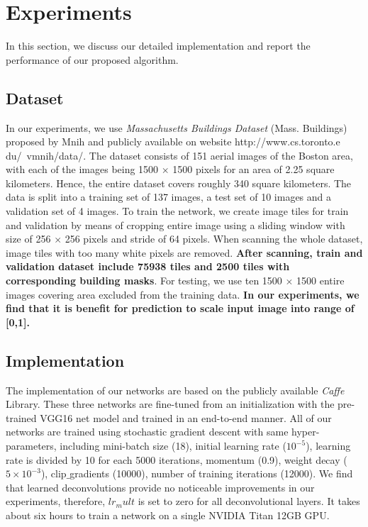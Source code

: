 \documentclass[runningheads]{llncs}
\begin{document}
\section{Experiments}
In this section, we discuss our detailed implementation and report the performance of our proposed algorithm.

\subsection{Dataset}
   In our experiments, we use \textit{Massachusetts Buildings Dataset} (Mass. Buildings) proposed by Mnih \cite{Mnih2013Machine} and publicly available on website http://www.cs.toronto.e
du/~vmnih/data/. The dataset consists of 151 aerial images of the Boston area, with each of the images being 1500 $\times$ 1500 pixels for an area of 2.25 square kilometers. Hence, the entire dataset covers roughly 340 square kilometers. The data is split into a training set of 137 images, a test set of 10 images and a validation set of 4 images. To train the network, we create image tiles for train and validation by means of cropping entire image using a sliding window with size of 256 $\times$ 256 pixels and stride of 64 pixels. When scanning the whole dataset, image tiles with too many white pixels are removed. \textbf{After scanning, train and validation dataset include 75938 tiles and 2500 tiles with corresponding building masks}. For testing, we use ten 1500 $\times$ 1500 entire images covering area excluded from the training data. \textbf{In our experiments, we find that it is benefit for prediction to scale input image into range of [0,1]. }

\subsection{Implementation}
   The implementation of our networks are based on the publicly  available \textit{Caffe} \cite{Jia2014Caffe} Library. These three networks are fine-tuned from an initialization with the pre-trained VGG16 net model and trained in an end-to-end manner. All of our networks are trained using stochastic gradient descent with same hyper-parameters, including mini-batch size (18), initial learning rate ($10^{-5}$), learning rate is divided by 10 for each 5000 iterations, momentum (0.9), weight decay ($5\times 10^{-3}$), clip$\_$gradients (10000), number of training iterations (12000). We find that learned deconvolutions provide no noticeable improvements in our experiments, therefore,  $lr_mult$ is set to zero for all deconvolutional layers. It takes about six hours to train a network on a single NVIDIA Titan 12GB GPU.
\end{document}
